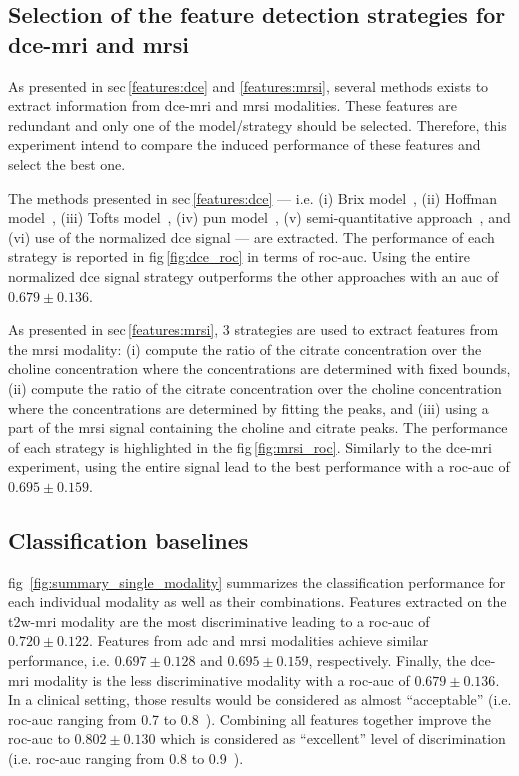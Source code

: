 \documentclass[final,3p,times,twocolumn]{elsarticle}
\begin{document}
\subsection{Selection of the feature detection strategies for
  \ac{dce}-\ac{mri} and \ac{mrsi}}\label{exp:dce_mrsi_sel}

As presented in \acs{sec}\,\ref{features:dce} and \ref{features:mrsi}, several
methods exists to extract information from \ac{dce}-\ac{mri} and \ac{mrsi}
modalities. These features are redundant and only one of the model/strategy
should be selected. Therefore, this experiment intend to compare the
induced performance of these features and select the best one.

The methods presented in \acs{sec}\,\ref{features:dce} --- i.e. (i) Brix
model~\cite{brix1991pharmacokinetic}, (ii) Hoffman
model~\cite{hoffmann1995pharmacokinetic}, (iii) Tofts
model~\cite{tofts1995quantitative}, (iv) \ac{pun}
model~\cite{gliozzi2011phenomenological}, (v) semi-quantitative
approach~\cite{huisman2001accurate}, and (vi) use of the normalized \ac{dce}
signal --- are extracted. The performance of each strategy is reported in
\acs{fig}\,\ref{fig:dce_roc} in terms of \ac{roc}-\ac{auc}. Using the entire
normalized \ac{dce} signal strategy outperforms the other approaches with an
\ac{auc} of $0.679 \pm 0.136$.

As presented in \acs{sec}\,\ref{features:mrsi}, 3 strategies are used to
extract features from the \ac{mrsi} modality: (i) compute the ratio of the
citrate concentration over the choline concentration where the concentrations
are determined with fixed \si{\ppm} bounds, (ii) compute the ratio of the
citrate concentration over the choline concentration where the concentrations
are determined by fitting the peaks, and (iii) using a part of the \ac{mrsi}
signal containing the choline and citrate peaks. The performance of each
strategy is highlighted in the \acs{fig}\,\ref{fig:mrsi_roc}. Similarly to the
\ac{dce}-\ac{mri} experiment, using the entire signal lead to the best
performance with a \ac{roc}-\ac{auc} of $0.695 \pm 0.159$.

\subsection{Classification baselines}

\Acl{fig}~\ref{fig:summary_single_modality} summarizes the classification
performance for each individual modality as well as their
combinations. Features extracted on the \ac{t2w}-\ac{mri} modality are the most
discriminative leading to a \ac{roc}-\ac{auc} of $0.720 \pm 0.122$. Features
from \ac{adc} and \ac{mrsi} modalities achieve similar performance,
i.e. $0.697 \pm 0.128$ and $0.695 \pm 0.159$, respectively. Finally, the
\ac{dce}-\ac{mri} modality is the less discriminative modality with a
\ac{roc}-\ac{auc} of $0.679 \pm 0.136$. In a clinical setting, those results
would be considered as almost ``acceptable'' (i.e. \ac{roc}-\ac{auc} ranging
from 0.7 to 0.8~\cite{hosmer2004applied}). Combining all features together
improve the \ac{roc}-\ac{auc} to $0.802 \pm 0.130$ which is considered as
``excellent'' level of discrimination (i.e. \ac{roc}-\ac{auc} ranging
from 0.8 to 0.9~\cite{hosmer2004applied}).
\end{document}
